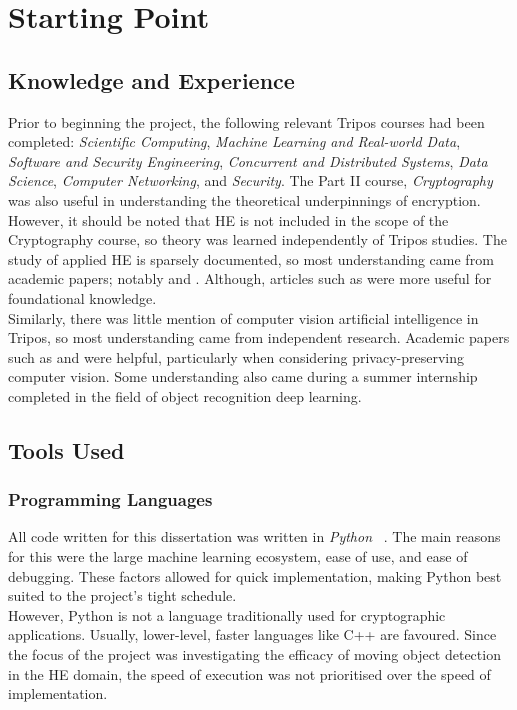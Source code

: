 \section{Starting Point}
\label{sec:startingPoint}
\subsection{Knowledge and Experience}
\indent \indent
Prior to beginning the project, the following relevant Tripos courses had been completed: \textit{Scientific Computing}, \textit{Machine Learning and Real-world Data}, \textit{Software and Security Engineering}, \textit{Concurrent and Distributed Systems}, \textit{Data Science}, \textit{Computer Networking}, and \textit{Security}. The Part II course, \textit{Cryptography} was also useful in understanding the theoretical underpinnings of encryption.
\smallskip \\ \indent
However, it should be noted that HE is not included in the scope of the Cryptography course, so theory was learned independently of Tripos studies. The study of applied HE is sparsely documented, so most understanding came from academic papers; notably \cite{CKKS} and \cite{SEAL}. Although, articles such as \cite{BrilliantHE} were more useful for foundational knowledge.
\smallskip \\ \indent
Similarly, there was little mention of computer vision artificial intelligence in Tripos, so most understanding came from independent research. Academic papers such as \cite{Stauffer} and \cite{Kulchandani} were helpful, particularly when considering privacy-preserving computer vision. Some understanding also came during a summer internship completed in the field of object recognition deep learning.
\subsection{Tools Used}
\subsubsection{Programming Languages}
\indent \indent
All code written for this dissertation was written in \textit{Python} ~\cite{Python}. The main reasons for this were the large machine learning ecosystem, ease of use, and ease of debugging. These factors allowed for quick implementation, making Python best suited to the project's tight schedule. 
\smallskip \\ \indent
However, Python is not a language traditionally used for cryptographic applications. Usually, lower-level, faster languages like C++ are favoured. Since the focus of the project was investigating the efficacy of moving object detection in the HE domain, the speed of execution was not prioritised over the speed of implementation.
